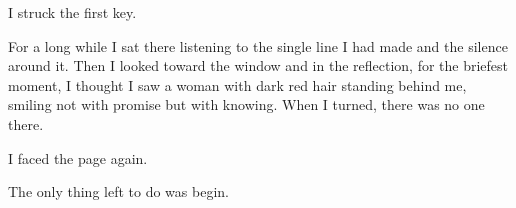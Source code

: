 I struck the first key.

For a long while I sat there listening to the single line I had made and
the silence around it. Then I looked toward the window and in the
reflection, for the briefest moment, I thought I saw a woman with dark
red hair standing behind me, smiling not with promise but with knowing.
When I turned, there was no one there.

I faced the page again.

The only thing left to do was begin.
